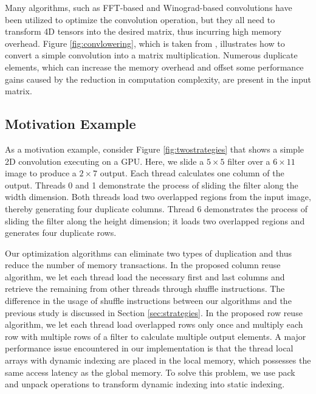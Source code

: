 Many algorithms, such as FFT-based and Winograd-based convolutions have been utilized to optimize the convolution operation, but they all need to
transform 4D tensors into the desired matrix, thus incurring high memory overhead. Figure \ref{fig:convlowering}, which is taken from
\cite{ChetlurWVCTCS14}, illustrates how to convert a simple convolution into a matrix multiplication. Numerous duplicate elements, which can increase the memory overhead and offset some performance gains caused by the reduction in computation complexity, are present in the input matrix.


\subsection{Motivation Example}

As a motivation example, consider Figure \ref{fig:twostrategies} that shows a simple 2D convolution executing on a GPU. Here, we slide a $5
\times 5$ filter over a $6 \times 11$ image to produce a $2 \times 7$ output. Each thread calculates one column of the output. Threads 0
and 1 demonstrate the process of sliding the filter along the width dimension. Both threads load two overlapped regions from the input
image, thereby generating four duplicate columns. Thread 6 demonstrates the process of sliding the filter along the height dimension; it
loads two overlapped regions and generates four duplicate rows.

Our optimization algorithms can eliminate two types of duplication and thus reduce the number of memory transactions. In the proposed column reuse algorithm, we let each thread load the necessary first and last columns and retrieve the remaining from other threads through shuffle
instructions. The difference in the usage of shuffle instructions between our algorithms and the previous study
\cite{vasilache2014fast} is discussed in Section \ref{sec:strategies}. In the proposed row reuse algorithm, we let each thread load overlapped
rows only once and multiply each row with multiple rows of a filter to calculate multiple output elements. A major performance issue
encountered in our implementation is that the thread local arrays with dynamic indexing are placed in the local memory, which possesses the same
access latency as the global memory. To solve this problem, we use pack and unpack operations to transform dynamic indexing into static indexing.

